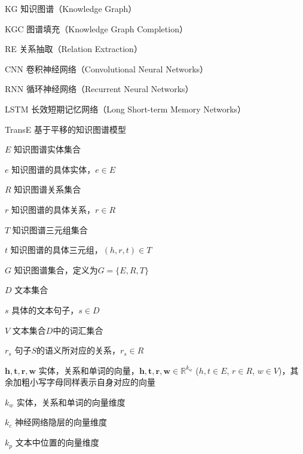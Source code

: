 \begin{denotation}[3cm]
\item[KG] 知识图谱（Knowledge Graph）
\item[KGC] 图谱填充（Knowledge Graph Completion）
\item[RE] 关系抽取（Relation Extraction）
\item[CNN] 卷积神经网络（Convolutional Neural Networks）
\item[RNN] 循环神经网络（Recurrent Neural Networks）
\item[LSTM] 长效短期记忆网络（Long Short-term Memory Networks）
\item[TransE] 基于平移的知识图谱模型
\item[$E$] 知识图谱实体集合
\item[$e$] 知识图谱的具体实体，$e \in E$
\item[$R$] 知识图谱关系集合
\item[$r$] 知识图谱的具体关系，$r \in R$
\item[$T$] 知识图谱三元组集合
\item[$t$] 知识图谱的具体三元组，$(h, r, t) \in T$
\item[$G$] 知识图谱集合，定义为$G = \{E, R, T\}$
\item[$D$] 文本集合
\item[$s$] 具体的文本句子，$s \in D$
\item[$V$] 文本集合$D$中的词汇集合
\item[$r_s$] 句子$S$的语义所对应的关系，$r_s \in R$
\item[$\textbf{h}, \textbf{t}, \textbf{r}, \textbf{w}$]	实体，关系和单词的向量，$\mathbf{h}, \mathbf{t}, \mathbf{r}, \mathbf{w} \in \mathbb{R}^{k_w}$ ($h, t \in E$, $r \in R$, $w \in V$)，其余加粗小写字母同样表示自身对应的向量
\item[$k_w$] 实体，关系和单词的向量维度
\item[$k_c$] 神经网络隐层的向量维度
\item[$k_p$] 文本中位置的向量维度
\end{denotation}

